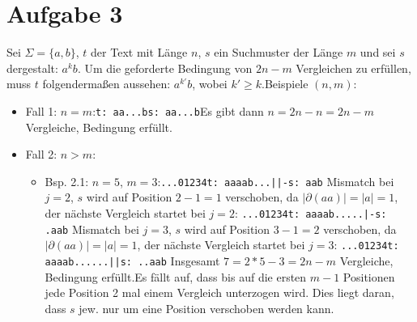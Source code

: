 \documentclass[a4paper,10pt,oneside,leqno]{scrartcl}
\begin{document}
\section*{Aufgabe 3}
Sei $\Sigma = \{a,b\}$, $t$ der Text mit Länge $n$, $s$ ein Suchmuster der Länge $m$ und sei $s$ dergestalt: $a^kb$. Um die geforderte
Bedingung von $2n -m$ Vergleichen zu erfüllen, muss $t$ folgendermaßen aussehen: $a^{k'}b$, wobei $k'\geq k$.\newline Beispiele $(n,m)$:\newline
\begin{itemize}
 \item Fall 1: $n=m$:\newline \texttt{t: aa...b}\newline \texttt{s: aa...b}\newline Es gibt dann $n= 2n-n = 2n-m$ Vergleiche, Bedingung erfüllt.
 \item Fall 2: $n>m$:\newline
\begin{itemize}
 \item Bsp. 2.1: $n=5$, $m=3$:\newline \texttt{...01234}\newline \texttt{t: aaaab}\newline \texttt{...||-}\newline\texttt{s: aab} \newline
 Mismatch bei $j=2$, $s$ wird auf Position $2-1=1$ verschoben, da $|\partial(aa)| = |a| = 1$, der nächste Vergleich startet bei $j=2$:\newline
 \texttt{...01234}\newline \texttt{t: aaaab}\newline \texttt{.....|-}\newline\texttt{s: .aab} \newline
  Mismatch bei $j=3$, $s$ wird auf Position $3-1=2$ verschoben, da $|\partial(aa)| = |a| = 1$, der nächste Vergleich startet bei $j=3$:\newline
  \texttt{...01234}\newline \texttt{t: aaaab}\newline \texttt{......||}\newline\texttt{s: ..aab} \newline
  Insgesamt $7 = 2*5-3 = 2n-m$ Vergleiche, Bedingung erfüllt.\newline Es fällt auf, dass bis auf die ersten $m-1$ Positionen jede Position
  2 mal einem Vergleich unterzogen wird. Dies liegt daran, dass $s$ jew. nur um eine Position verschoben werden kann.

\end{itemize}
\end{itemize}
\end{document}

